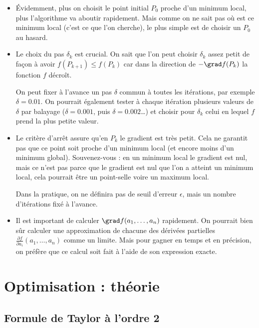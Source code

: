 	\begin{itemize}
		\item \'Evidemment, plus on choisit le point initial $P_0$ proche d'un minimum local, plus l'algorithme va aboutir rapidement. Mais comme on ne sait pas où est ce minimum local (c'est ce que l'on cherche), le plus simple est de choisir un $P_0$ au hasard.
		
		\item Le choix du pas $\delta_k$ est crucial. On sait que l'on peut choisir $\delta_k$ assez petit de façon à avoir $f(P_{k+1}) \le f(P_k)$ car dans la direction de $-\grad f(P_k)$ la fonction $f$ décroît.
		
		
		On peut fixer à l'avance un pas $\delta$ commun à toutes les itérations, par exemple $\delta = 0.01$. On pourrait également tester à chaque itération plusieurs valeurs de $\delta$ par balayage ($\delta = 0.001$, puis $\delta=0.002$\ldots) et choisir pour $\delta_k$ celui en lequel $f$ prend la plus petite valeur.
		
		\item Le critère d'arrêt assure qu'en $P_k$ le gradient est très petit. Cela ne garantit pas que ce point soit proche d'un minimum local (et encore moins d'un minimum global). Souvenez-vous : en un minimum local le gradient est nul, mais ce n'est pas parce que le gradient est nul que l'on a atteint un minimum local, cela pourrait être un point-selle voire un maximum local.
		
		Dans la pratique, on ne définira pas de seuil d'erreur $\epsilon$, mais un nombre d'itérations fixé à l'avance.
		
		\item Il est important de calculer $\grad f(a_1,\ldots,a_n)$ rapidement. On pourrait bien sûr calculer une approximation de chacune des dérivées partielles $\frac{\partial f}{\partial a_i}(a_1,\ldots,a_n)$ comme un limite. Mais pour gagner en temps et en précision, on préfère que ce calcul soit fait à l'aide de son expression exacte. 
		
	\end{itemize}
\section{Optimisation : théorie}
\subsection{Formule de Taylor à l'ordre 2}


